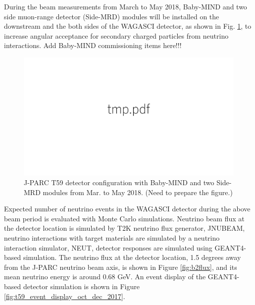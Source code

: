 


During the beam measurements from March to May 2018, Baby-MIND and two side muon-range detector (Side-MRD) modules will be installed on the downstream and the both sides of the WAGASCI detector, as shown in Fig. \ref{fig:det_config_mar_may2018}, to increase angular acceptance for secondary charged particles from neutrino interactions.
Add Baby-MIND commissioning items here!!!
 
\begin{figure}[tbh]
\begin{center}
\includegraphics[width=0.8\linewidth]{fig/tmp.pdf}
\end{center}
\caption{
J-PARC T59 detector configuration with Baby-MIND and two Side-MRD modules from Mar. to May 2018.
(Need to prepare the figure.)}
\label{fig:det_config_mar_may2018}
\end{figure}


Expected number of neutrino events in the WAGASCI detector during the above beam period is evaluated with Monte Carlo simulations. 
Neutrino beam flux at the detector location is simulated by T2K neutrino flux generator, JNUBEAM, neutrino interactions with target materials are simulated by a neutrino interaction simulator, NEUT, detector responses are simulated using GEANT4-based simulation. 
The neutrino flux at the detector location, 1.5 degrees away from the J-PARC neutrino beam axis, is shown in Figure \ref{fig:b2flux}, and its mean neutrino energy is around 0.68 GeV.
An event display of the GEANT4-based detector simulation is shown in Figure \ref{fig:t59_event_display_oct_dec_2017}.



